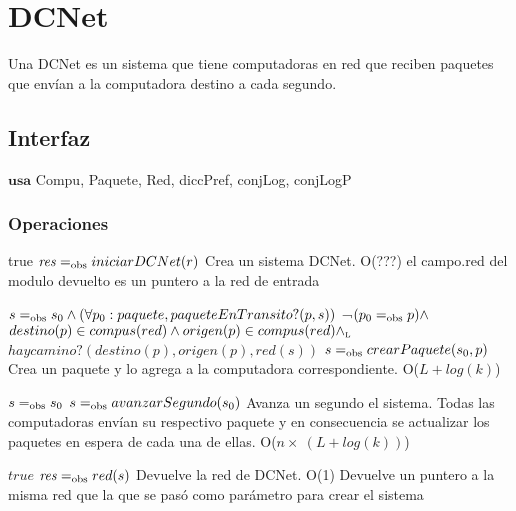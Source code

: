 
\section{DCNet}

Una DCNet es un sistema que tiene computadoras en red que reciben paquetes que envían a la computadora destino a cada segundo.

\subsection{Interfaz}

$\textbf{usa}$  
Compu, Paquete, Red, diccPref, conjLog, conjLogP


\subsubsection*{Operaciones}


 {true}
 {$\text{\textit{res}} =_{\mathrm{obs}} iniciarDCNet(r)$}
 {Crea un sistema DCNet.}
 {O(???)}
 {el campo.red del modulo devuelto es un puntero a la red de entrada}

 {$s =_{\mathrm{obs}} s_0 \land (\forall p_0:paquete,paqueteEnTransito?(p,s))$ ¬$(p_0 =_{\mathrm{obs}} p) \land$ \\ $destino(p) \in compus(red) \land origen(p) \in compus(red) \land_{\mathrm{\scriptscriptstyle{L}}} $ \\ $haycamino?(destino(p),origen(p),red(s))$}
 {$s =_{\mathrm{obs}} crearPaquete(s_0, p)$}
 {Crea un paquete y lo agrega a la computadora correspondiente.}
 {O($L + log(k)$)}
 {}
 
 {$s =_{\mathrm{obs}} s_0$}
 {$s =_{\mathrm{obs}} avanzarSegundo(s_0)$}
 {Avanza un segundo el sistema. Todas las computadoras envían su respectivo paquete y en consecuencia se actualizar los paquetes en espera de cada una de ellas.}
 {O($n \times\ (L + log(k))$)}
 
 {$true$}
 {$\text{\textit{res}} =_{\mathrm{obs}} red(s)$}
 {Devuelve la red de DCNet.}
 {O(1)}
 {Devuelve un puntero a la misma red que la que se pas\'o como par\'ametro para crear el sistema}

